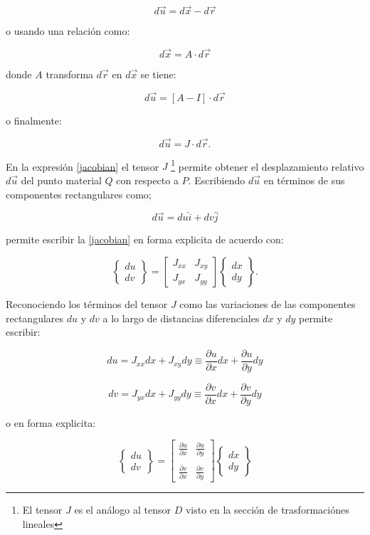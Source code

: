 \documentclass[../notas medios.tex]{subfiles}
\begin{document}
\[d\vec u = d\vec x - d\vec r\]

o usando una relación como:

\[d\vec x = A \cdot d\vec r\]

donde $A$ transforma $d\vec{r}$ en $d\vec{x}$ se tiene:

\[d\vec u = \left[ {A - I} \right] \cdot d\vec r\]

o finalmente:

\begin{equation}
d\vec u = J \cdot d\vec r.
\label{jacobian}
\end{equation}

En la expresión \cref{jacobian} el tensor $J$ \footnote{El tensor $J$ es el análogo al tensor $D$ visto en la sección de trasformaciónes lineales} permite obtener el desplazamiento relativo $d\vec{u}$ del punto material $Q$ con respecto a $P$. Escribiendo $d\vec{u}$ en términos de sus componentes rectangulares como; 

\[d\vec u = du\hat i + dv\hat j\]

permite escribir la \cref{jacobian} en forma explicita de acuerdo con:


\[\left\{ {\begin{array}{*{20}{c}}
{du}\\
{dv}
\end{array}} \right\} = \left[ {\begin{array}{*{20}{c}}
{{J_{xx}}}&{{J_{xy}}}\\
{{J_{yx}}}&{{J_{yy}}}
\end{array}} \right]\left\{ {\begin{array}{*{20}{c}}
{dx}\\
{dy}
\end{array}} \right\}.\]

Reconociendo los términos del tensor $J$ como las variaciones de las componentes rectangulares $du$ y $dv$ a lo largo de distancias diferenciales $dx$ y $dy$ permite escribir:


\[du = {J_{xx}}dx + {J_{xy}}dy \equiv \frac{{\partial u}}{{\partial x}}dx + \frac{{\partial u}}{{\partial y}}dy\]

\[dv = {J_{yx}}dx + {J_{yy}}dy \equiv \frac{{\partial v}}{{\partial x}}dx + \frac{{\partial v}}{{\partial y}}dy\]

o en forma explicita:

\[\left\{ {\begin{array}{*{20}{c}}
{du}\\
{dv}
\end{array}} \right\} = \left[ {\begin{array}{*{20}{c}}
{\frac{{\partial u}}{{\partial x}}}&{\frac{{\partial u}}{{\partial y}}}\\\\
{\frac{{\partial v}}{{\partial x}}}&{\frac{{\partial v}}{{\partial y}}}
\end{array}} \right]\left\{ {\begin{array}{*{20}{c}}
{dx}\\
{dy}
\end{array}} \right\}\]
\end{document}
